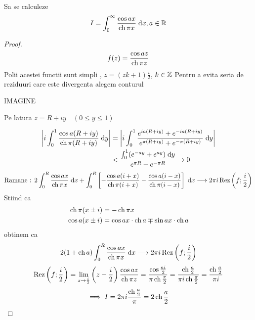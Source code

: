     \begin{aplicatie}
        Sa se calculeze
        \[
            I = \int_{0}^{\infty} \frac{\cos ax}{\operatorname{ch} \pi x} \; \mathrm{d} x , a \in \mathbb{R}
        \]
        \begin{proof}
            \[
                f(z) = \frac{\cos az}{\operatorname{ch} \pi z}
            \]
            Polii acestei functii sunt simpli , $z = (zk+1)\frac{i}{2}$, $k \in \mathbb{Z}$
            Pentru a evita seria de reziduuri care este divergenta alegem conturul

            IMAGINE

            Pe latura $z=R + i y \quad ( 0 \leq y \leq 1)$

            \begin{align*}
              \left| i \int_{0}^{1} \frac{\cos a (R+iy)}{\operatorname{ch} \pi (R+iy)} \; \mathrm{d} y \right|
                 &= \left| i \int_{0}^{1} \frac{e^{ia(R+iy)} + e^{-ia(R+iy)}}
                                           {e^{\pi(R+iy)} + e^{-\pi(R+iy)}} \; \mathrm{d} y \right|
              \\ &< \frac{\int_{0}^{1} (e^{-ay} + e^{ay}) \; \mathrm{d} y}{e^{\pi R} - e^{-\pi R}}
                \to 0
            \end{align*}
            \[
                \text{Ramane : } 2 \int_{0}^{R} \frac{\cos ax}{\operatorname{ch} \pi x} \; \mathrm{d} x
                    + \int_{0}^{R} \left[
                                    - \frac{\cos a(i+x)}{\operatorname{ch} \pi (i+x)}
                                    - \frac{\cos a(i-x)}{\operatorname{ch} \pi (i-x)}
                                   \right] \; \mathrm{d} x
                \longrightarrow 2 \pi i \operatorname{Rez} \left(f;\frac{i}{2}\right)
            \]
            Stiind ca
            \begin{align*}
                \operatorname{ch} \pi( x \pm i) &= -\operatorname{ch} \pi x
                \\
                \cos a(x \pm i) &= \cos ax \cdot \operatorname{ch} a \mp \sin ax \cdot \operatorname{ch} a
            \end{align*}
            obtinem ca
            \[
                2(1+\operatorname{ch} a) \int_{0}^{R} \frac{\cos ax}{\operatorname{ch} \pi x} \; \mathrm{d} x
                    \longrightarrow 2 \pi i \operatorname{Rez} \left(f;\frac{i}{2}\right)
            \]
            \[
                \operatorname{Rez} \left(f;\frac{i}{2} \right)
                    = \lim_{z\to\frac{i}{2}} \left( z- \frac{i}{2}\right) \frac{\cos az}{\operatorname{ch} \pi z}
                    = \frac{\cos \frac{ai}{2}}{\pi \operatorname{ch} \frac{\pi}{2}}
                    = \frac{\operatorname{ch} \frac{a}{2}}{\pi i \operatorname{ch} \frac{\pi}{2}}
                    = \frac{\operatorname{ch} \frac{a}{2}}{\pi i}
            \]
            \[
                \implies I = 2 \pi i \frac{\operatorname{ch} \frac{a}{2}}{\pi} = 2 \operatorname{ch} \frac{a}{2}
            \]
        \end{proof}

    \end{aplicatie}

